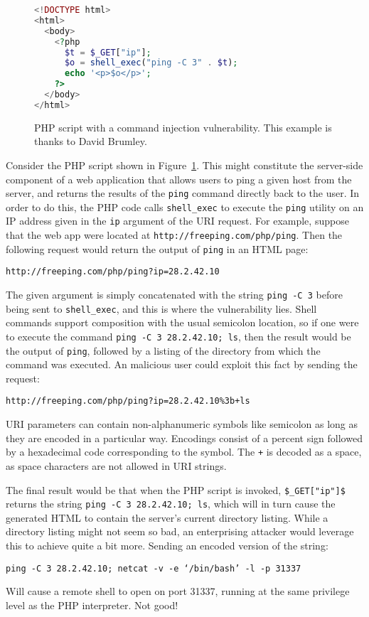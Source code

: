 \documentclass[11pt,twoside]{scrartcl}
\begin{document}
\begin{figure}
\begin{lstlisting}[language=PHP]
<!DOCTYPE html>
<html>
  <body>
    <?php 
      $t = $_GET["ip"];
      $o = shell_exec("ping -C 3" . $t);
      echo '<p>$o</p>'; 
    ?>
  </body>
</html>
\end{lstlisting}

\caption{\label{fig:injection1} PHP script with a command injection vulnerability. This example is thanks to David Brumley.}
\end{figure}

Consider the PHP script shown in Figure~\ref{fig:injection1}. This might constitute the server-side component of a web application that allows users to ping a given host from the server, and returns the results of the \verb'ping' command directly back to the user. In order to do this, the PHP code calls \verb'shell_exec' to execute the \verb'ping' utility on an IP address given in the \verb'ip' argument of the URI request. For example, suppose that the web app were located at \nolinkurl{http://freeping.com/php/ping}. Then the following request would return the output of \verb'ping' in an HTML page:
\begin{verbatim}
http://freeping.com/php/ping?ip=28.2.42.10
\end{verbatim}
The given argument is simply concatenated with the string \verb'ping -C 3' before being sent to \verb'shell_exec', and this is where the vulnerability lies. Shell commands support composition with the usual semicolon location, so if one were to execute the command \verb'ping -C 3 28.2.42.10; ls', then the result would be the output of \verb'ping', followed by a listing of the directory from which the command was executed. An malicious user could exploit this fact by sending the request:
\begin{verbatim}
http://freeping.com/php/ping?ip=28.2.42.10%3b+ls
\end{verbatim}
URI parameters can contain non-alphanumeric symbols like semicolon as long as they are encoded in a particular way. Encodings consist of a percent sign followed by a hexadecimal code corresponding to the symbol. The \verb'+' is decoded as a space, as space characters are not allowed in URI strings. 

The final result would be that when the PHP script is invoked, \verb'$_GET["ip"]$' returns the string \verb'ping -C 3 28.2.42.10; ls', which will in turn cause the generated HTML to contain the server's current directory listing. While a directory listing might not seem so bad, an enterprising attacker would leverage this to achieve quite a bit more. Sending an encoded version of the string:
\begin{verbatim}
ping -C 3 28.2.42.10; netcat -v -e ‘/bin/bash’ -l -p 31337
\end{verbatim}
Will cause a remote shell to open on port 31337, running at the same privilege level as the PHP interpreter. Not good!
\end{document}
